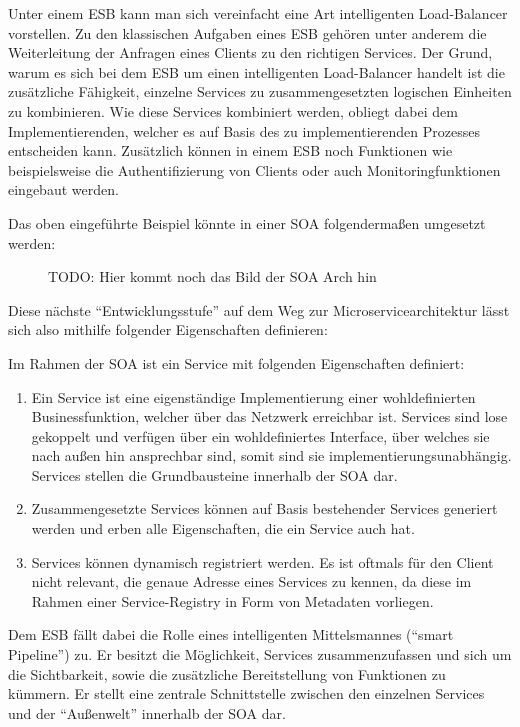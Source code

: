 Unter einem \ac{ESB} kann man sich vereinfacht eine Art intelligenten Load-Balancer vorstellen. Zu den klassischen Aufgaben eines \ac{ESB} gehören unter anderem die Weiterleitung der Anfragen eines Clients zu den richtigen Services. Der Grund, warum es sich bei dem \ac{ESB} um einen intelligenten Load-Balancer handelt ist die zusätzliche Fähigkeit, einzelne Services zu zusammengesetzten logischen Einheiten zu kombinieren. Wie diese Services kombiniert werden, obliegt dabei dem Implementierenden, welcher es auf Basis des zu implementierenden Prozesses entscheiden kann. Zusätzlich können in einem \ac{ESB} noch Funktionen wie beispielsweise die Authentifizierung von Clients oder auch Monitoringfunktionen eingebaut werden.

Das oben eingeführte Beispiel könnte in einer \ac{SOA} folgendermaßen umgesetzt werden:
\begin{figure}[h]
	\centering
	\caption{TODO: Hier kommt noch das Bild der SOA Arch hin}
\end{figure}

Diese nächste \enquote{Entwicklungsstufe} auf dem Weg zur Microservicearchitektur lässt sich also mithilfe folgender Eigenschaften definieren:

\begin{definition}
	Im Rahmen der \ac{SOA} ist ein Service mit folgenden Eigenschaften definiert: \autocite[S. 4]{microservice_enterprise}
	\begin{enumerate}
		\item Ein Service ist eine eigenständige Implementierung einer wohldefinierten Businessfunktion, welcher über das Netzwerk erreichbar ist. Services sind lose gekoppelt und verfügen über ein wohldefiniertes Interface, über welches sie nach außen hin ansprechbar sind, somit sind sie implementierungsunabhängig. Services stellen die Grundbausteine innerhalb der \ac{SOA} dar.
		\item Zusammengesetzte Services können auf Basis bestehender Services generiert werden und erben alle Eigenschaften, die ein Service auch hat.
		\item Services können dynamisch registriert werden. Es ist oftmals für den Client nicht relevant, die genaue Adresse eines Services zu kennen, da diese im Rahmen einer Service-Registry in Form von Metadaten vorliegen.
	\end{enumerate}
	Dem \ac{ESB} fällt dabei die Rolle eines intelligenten Mittelsmannes (\enquote{smart Pipeline}) zu. Er besitzt die Möglichkeit, Services zusammenzufassen und sich um die Sichtbarkeit, sowie die zusätzliche Bereitstellung von Funktionen zu kümmern. Er stellt eine zentrale Schnittstelle zwischen den einzelnen Services und der \enquote{Außenwelt} innerhalb der \ac{SOA} dar.
\end{definition}

